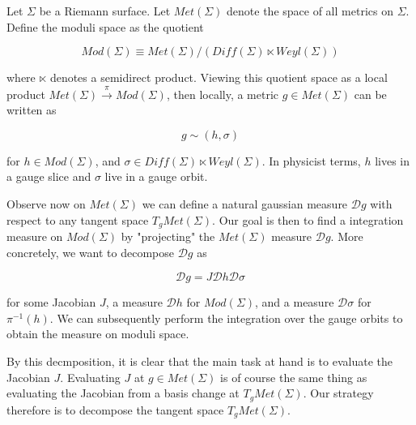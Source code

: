 Let $\Sigma$ be a Riemann surface. Let $Met(\Sigma)$ denote the space of all metrics on $\Sigma$. Define the moduli space as the quotient

\begin{equation}
    Mod(\Sigma) \equiv Met(\Sigma)/(Diff(\Sigma) \ltimes Weyl(\Sigma))
\end{equation}

where $\ltimes$ denotes a semidirect product. Viewing this quotient space as a local product $Met(\Sigma) \xrightarrow{\pi} Mod(\Sigma)$, then locally, a metric $g \in Met(\Sigma)$ can be written as

\begin{equation}
    g \sim (h, \sigma)
\end{equation}

for $h \in Mod(\Sigma)$, and $\sigma \in Diff(\Sigma) \ltimes Weyl(\Sigma)$. In physicist terms, $h$ lives in a gauge slice and $\sigma$ live in a gauge orbit.


Observe now on $Met(\Sigma)$ we can define a natural gaussian measure $\mathcal{D}g$ with respect to any tangent space $T_g Met(\Sigma)$. Our goal is then to find a integration measure on $Mod(\Sigma)$ by "projecting" the $Met(\Sigma)$ measure $\mathcal D g$. More concretely, we want to decompose $\mathcal D g$ as

\begin{equation}
    \mathcal D g = J \mathcal D h \mathcal D \sigma
\end{equation}

for some Jacobian $J$, a measure $\mathcal D h$ for $Mod(\Sigma)$, and a measure $\mathcal D \sigma$ for $\pi^{-1}(h)$. We can subsequently perform the integration over the gauge orbits to obtain the measure on moduli space.

By this decmposition, it is clear that the main task at hand is to evaluate the Jacobian $J$. Evaluating $J$ at $g \in Met(\Sigma)$ is of course the same thing as evaluating the Jacobian from a basis change at $T_g Met(\Sigma)$. Our strategy therefore is to decompose the tangent space $T_g Met(\Sigma)$.
